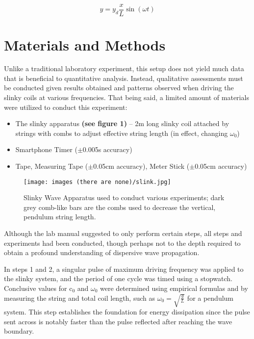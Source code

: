 \documentclass[12pt, letterpaper, twoside]{article}
\begin{document}
\begin{equation}
    y = y_d\frac{x}{L}\sin{(\omega t)}
\end{equation}

\section{Materials and Methods}

Unlike a traditional laboratory experiment, this setup does not yield much data that is beneficial to quantitative analysis. Instead, qualitative assessments must be conducted given results obtained and patterns observed when driving the slinky coils at various frequencies. That being said, a limited amount of materials were utilized to conduct this experiment:

\begin{itemize}
    \item The slinky apparatus \textbf{(see figure 1)} -- 2m long slinky coil attached by strings with combs to adjust effective string length (in effect, changing $\omega_0$)
    \item Smartphone Timer ($\pm$0.005s accuracy)
    \item Tape, Measuring Tape ($\pm$0.05cm accuracy), Meter Stick ($\pm$0.05cm accuracy)
\end{itemize}

\begin{figure}[!ht]
    \centering
    \texttt{[image: images (there are none)/slink.jpg]}
    \caption{Slinky Wave Apparatus used to conduct various experiments; dark grey comb-like bars are the combs used to decrease the vertical, pendulum string length.}
    \label{fig:my_label}
\end{figure}

Although the lab manual suggested to only perform certain steps, all steps and experiments had been conducted, though perhaps not to the depth required to obtain a profound understanding of dispersive wave propagation.

In steps 1 and 2, a singular pulse of maximum driving frequency was applied to the slinky system, and the period of one cycle was timed using a stopwatch. Conclusive values for c$_0$ and $\omega_0$ were determined using empirical formulas and by measuring the string and total coil length, such as $\omega_0 = \sqrt{\frac{g}{L}}$ for a pendulum system. This step establishes the foundation for energy dissipation since the pulse sent across is notably faster than the pulse reflected after reaching the wave boundary.
\end{document}
